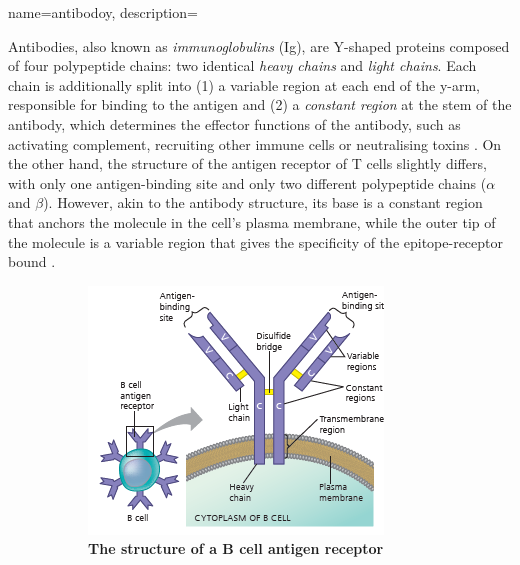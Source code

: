{name=antibodoy, 
description={
Antibodies, also known as \textit{immunoglobulins} (Ig), are Y-shaped proteins composed of four polypeptide chains: two identical \textit{heavy chains} and \textit{light chains}. Each chain is additionally split into (1) a variable region at each end of the y-arm, responsible for binding to the antigen and (2) a \textit{constant region} at the stem of the antibody, which determines the  effector functions of the antibody, such as activating complement, recruiting other immune cells or neutralising toxins .
On the other hand, the structure of the antigen receptor of T cells slightly differs, with only one antigen-binding site and only two different polypeptide chains ($\alpha$ and $\beta$). However, akin to the antibody structure, its base is a constant region that anchors the molecule in the cell’s plasma membrane, while the outer tip of the molecule is a variable region that gives the specificity of the epitope-receptor bound . 
\begin{figure}
     \centering
     \begin{subfigure}[b]{0.45\textwidth}
         \centering
         \includegraphics[width=\textwidth]{figures/B-cell-receptor.png}
         \caption{\textbf{The structure of a B cell antigen receptor}}
         \label{fig:B-cell-receptor}
     \end{subfigure}
     \hfill
     \begin{subfigure}[b]{0.45\textwidth}
         \centering

\end{subfigure}
\end{figure}}}

